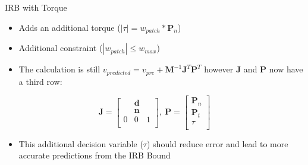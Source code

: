 \begin{frame}{IRB with Torque}
\begin{itemize}
    \item Adds an additional torque ($|\tau| = w_{patch}*\textbf{P}_n$)
    \item Additional constraint ($|w_{patch}|\leq w_{max}$)
    \item The calculation is still $v_{predicted} = v_{pre} + \textbf{M}^{-1} \textbf{J}^T \textbf{P}^T$ however \textbf{J} and \textbf{P} now have a third row: 
\end{itemize}



\centering
\[
    \textbf{J} =
        \left [
        \begin{array}{ccc}
             & \textbf{d} & \\
             & \textbf{n} & \\
             0 & 0 & 1 \\
        \end{array}
        \right ],\
            \textbf{P} = 
       \left [
        \begin{array}{c}
            \textbf{P}_n \\
            \textbf{P}_t \\
            \tau   \\
        \end{array}
        \right ]
\]

\begin{itemize}
    \item This additional decision variable ($\tau$) should reduce error and lead to more accurate predictions from the IRB Bound

\end{itemize}   

  
\end{frame}
    
